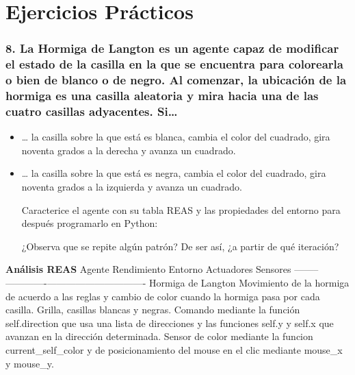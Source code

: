 \documentclass[11pt]{article}
\begin{document}
    \section{Ejercicios Prácticos}\label{ejercicios-pruxe1cticos}

\subsubsection{8. La Hormiga de Langton es un agente capaz de modificar
el estado de la casilla en la que se encuentra para colorearla o bien de
blanco o de negro. Al comenzar, la ubicación de la hormiga es una
casilla aleatoria y mira hacia una de las cuatro casillas adyacentes.
Si\ldots{}}\label{la-hormiga-de-langton-es-un-agente-capaz-de-modificar-el-estado-de-la-casilla-en-la-que-se-encuentra-para-colorearla-o-bien-de-blanco-o-de-negro.-al-comenzar-la-ubicaciuxf3n-de-la-hormiga-es-una-casilla-aleatoria-y-mira-hacia-una-de-las-cuatro-casillas-adyacentes.-si}

\begin{itemize}
\item
  \ldots{} la casilla sobre la que está es blanca, cambia el color del
  cuadrado, gira noventa grados a la derecha y avanza un cuadrado.
\item
  \ldots{} la casilla sobre la que está es negra, cambia el color del
  cuadrado, gira noventa grados a la izquierda y avanza un cuadrado.

  Caracterice el agente con su tabla REAS y las propiedades del entorno
  para después programarlo en Python:

  ¿Observa que se repite algún patrón? De ser así, ¿a partir de qué
  iteración?
\end{itemize}

    \textbf{Análisis REAS} \textbar{} Agente \textbar{} Rendimiento
\textbar{} Entorno \textbar{} Actuadores \textbar{} Sensores \textbar{}
\textbar--------\textbar-------------\textbar---------\textbar------------\textbar----------\textbar{}
\textbar{} Hormiga de Langton \textbar{} Movimiento de la hormiga de
acuerdo a las reglas y cambio de color cuando la hormiga pasa por cada
casilla. \textbar{} Grilla, casillas blancas y negras. \textbar{}
Comando mediante la función self.direction que usa una lista de
direcciones y las funciones self.y y self.x que avanzan en la dirección
determinada. \textbar{} Sensor de color mediante la funcion
current\_self\_color y de posicionamiento del mouse en el clic mediante
mouse\_x y mouse\_y. \textbar{}
\end{document}
